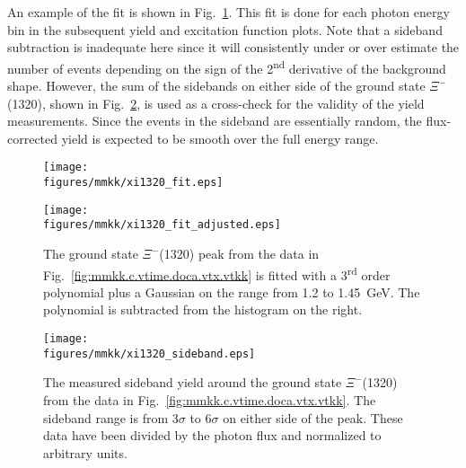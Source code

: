 An example of the fit is shown in Fig.~\ref{fig:yield.determin}. This fit is done for each photon energy bin in the subsequent yield and excitation function plots. Note that a sideband subtraction is inadequate here since it will consistently under or over estimate the number of events depending on the sign of the 2\textsuperscript{nd} derivative of the background shape. However, the sum of the sidebands on either side of the ground state $\Xi^-$(1320), shown in Fig.~\ref{fig:mmkk.sideband}, is used as a cross-check for the validity of the yield measurements. Since the events in the sideband are essentially random, the flux-corrected yield is expected to be smooth over the full energy range.

\begin{figure}[bh]\centering
\begin{minipage}{0.49\linewidth}\centering
    \texttt{[image: \\figures/mmkk/xi1320\_fit.eps]}
\end{minipage}
\begin{minipage}{0.49\linewidth}\centering
    \texttt{[image: \\figures/mmkk/xi1320\_fit\_adjusted.eps]}
\end{minipage}
    \caption[Yield Determination]{\label{fig:yield.determin}The ground state $\Xi^-$(1320) peak from the data in Fig.~\ref{fig:mmkk.c.vtime.doca.vtx.vtkk} is fitted with a 3\textsuperscript{rd} order polynomial plus a Gaussian on the range from 1.2 to 1.45~GeV. The polynomial is subtracted from the histogram on the right.}
\end{figure}

\begin{figure}[bh]\centering
    \texttt{[image: \\figures/mmkk/xi1320\_sideband.eps]}
    \caption[\texorpdfstring{$\Xi^-$}{Xi-}(1320) Sideband Yield]{\label{fig:mmkk.sideband}The measured sideband yield around the ground state $\Xi^-$(1320) from the data in Fig.~\ref{fig:mmkk.c.vtime.doca.vtx.vtkk}. The sideband range is from $3\sigma$ to $6\sigma$ on either side of the peak. These data have been divided by the photon flux and normalized to arbitrary units.}
\end{figure}

